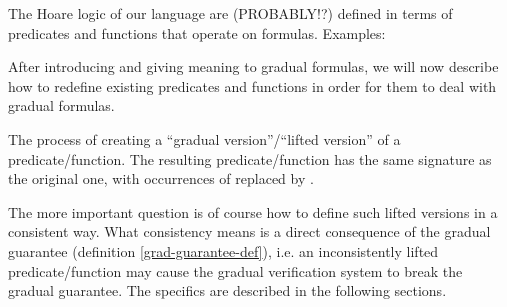 
The Hoare logic of our language are (PROBABLY!?) defined in terms of predicates and functions that operate on formulas.
Examples:

After introducing and giving meaning to gradual formulas, we will now describe how to redefine existing predicates and functions in order for them to deal with gradual formulas.

\begin{definition}
    The process of creating a “gradual version”/“lifted version” of a predicate/function.
    The resulting predicate/function has the same signature as the original one, with occurrences of \setFormula replaced by \setGFormula.
\end{definition}

The more important question is of course how to define such lifted versions in a consistent way.
What consistency means is a direct consequence of the gradual guarantee (definition \ref{grad-guarantee-def}), i.e. an inconsistently lifted predicate/function may cause the gradual verification system to break the gradual guarantee.
The specifics are described in the following sections.



